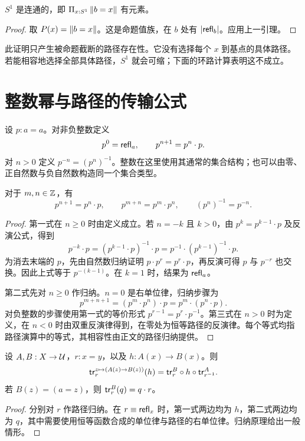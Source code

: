 \begin{proposition}[圆周的连通性]
$S^1$ 是连通的，即 $\Pi_{x:S^1}\left\|b=x\right\|$ 有元素。
\end{proposition}
\begin{proof}
取 $P(x)=\left\|b=x\right\|$。这是命题值族，在 $b$ 处有 $|\mathsf{refl}_b|$。应用上一引理。
\end{proof}

\begin{remark}
此证明只产生被命题截断的路径存在性。它没有选择每个 $x$ 到基点的具体路径。若能相容地选择全部具体路径，$S^1$ 就会可缩；下面的环路计算表明这不成立。
\end{remark}

\section{整数幂与路径的传输公式}

\begin{definition}[环路的整数幂]
设 $p:a=a$。对非负整数定义
\[
 p^0=\mathsf{refl}_a,\qquad p^{n+1}=p^n\cdot p.
\]
对 $n>0$ 定义 $p^{-n}=(p^n)^{-1}$。整数在这里使用其通常的集合结构；也可以由零、正自然数与负自然数构造同一个集合类型。
\end{definition}

\begin{lemma}[整数幂的运算]
对于 $m,n\in\mathbb Z$，有
\[
 p^{n+1}=p^n\cdot p,\qquad
 p^{m+n}=p^m\cdot p^n,\qquad
 (p^n)^{-1}=p^{-n}.
\]
\end{lemma}
\begin{proof}
第一式在 $n\geq0$ 时由定义成立。若 $n=-k$ 且 $k>0$，由 $p^k=p^{k-1}\cdot p$ 及反演公式，得到
\[
 p^{-k}\cdot p
 =(p^{k-1}\cdot p)^{-1}\cdot p
 =p^{-1}\cdot(p^{k-1})^{-1}\cdot p.
\]
为消去末端的 $p$，先由自然数归纳证明 $p\cdot p^r=p^r\cdot p$，再反演可得 $p$ 与 $p^{-r}$ 也交换。因此上式等于 $p^{-(k-1)}$。在 $k=1$ 时，结果为 $\mathsf{refl}_a$。

第二式先对 $n\geq0$ 作归纳。$n=0$ 是右单位律，归纳步骤为
\[
 p^{m+n+1}=(p^m\cdot p^n)\cdot p
 =p^m\cdot(p^n\cdot p).
\]
对负整数的步骤使用第一式的等价形式 $p^{r-1}=p^r\cdot p^{-1}$。第三式在 $n>0$ 时为定义，在 $n<0$ 时由双重反演律得到，在零处为恒等路径的反演律。每个等式均指路径演算中的等式，其相容性由正文的路径归纳提供。
\end{proof}

\begin{lemma}[函数族中的传输]
设 $A,B:X\to\mathcal U$，$r:x=y$，以及 $h:A(x)\to B(x)$。则
\[
 \mathsf{tr}^{z\mapsto(A(z)\to B(z))}_r(h)
 =\mathsf{tr}^B_r\circ h\circ\mathsf{tr}^A_{r^{-1}}.
\]
若 $B(z)=(a=z)$，则 $\mathsf{tr}^B_r(q)=q\cdot r$。
\end{lemma}
\begin{proof}
分别对 $r$ 作路径归纳。在 $r\equiv\mathsf{refl}_x$ 时，第一式两边均为 $h$，第二式两边均为 $q$，其中需要使用恒等函数合成的单位律与路径的右单位律。归纳原理给出一般情形。
\end{proof}

